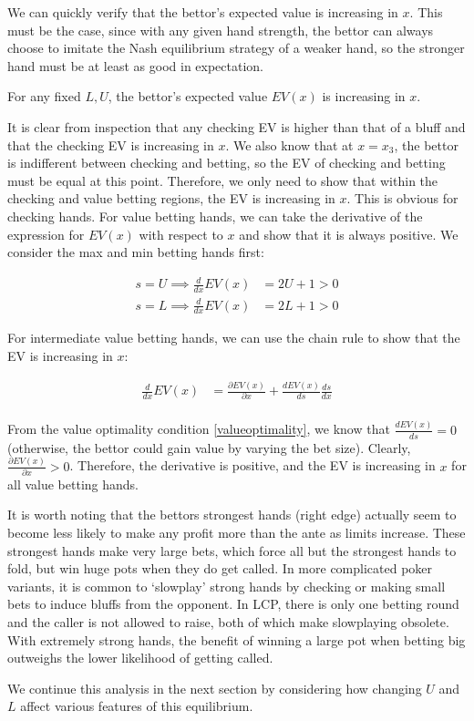 \documentclass[../../main/main.tex]{subfiles}
\begin{document}
We can quickly verify that the bettor's expected value is increasing in $x$. This must be the case, since with any given hand strength, the bettor can always choose to imitate the Nash equilibrium strategy of a weaker hand, so the stronger hand must be at least as good in expectation.

\begin{theorem}
    \label{thm:ev_increasing}
    For any fixed $L, U$, the bettor's expected value $EV(x)$ is increasing in $x$.
\end{theorem}

\begin{customproof}
    It is clear from inspection that any checking EV is higher than that of a bluff and that the checking EV is increasing in $x$. We also know that at $x=x_3$, the bettor is indifferent between checking and betting, so the EV of checking and betting must be equal at this point. Therefore, we only need to show that within the checking and value betting regions, the EV is increasing in $x$. This is obvious for checking hands. For value betting hands, we can take the derivative of the expression for $EV(x)$ with respect to $x$ and show that it is always positive. We consider the max and min betting hands first:
    
    \begin{align*}
        s = U \implies \frac{d}{dx} EV(x) & = 2U + 1 > 0  \\
        s = L \implies \frac{d}{dx} EV(x) & = 2L + 1 > 0 
    \end{align*}
    
    For intermediate value betting hands, we can use the chain rule to show that the EV is increasing in $x$:
    
    \begin{align*}
        \frac{d}{dx} EV(x) & = \frac{\partial EV(x)}{\partial x} + \frac{dEV(x)}{ds} \frac{d s}{d x} \\
    \end{align*}

    From the value optimality condition \ref{valueoptimality}, we know that $\frac{dEV(x)}{ds} = 0$ (otherwise, the bettor could gain value by varying the bet size). Clearly, $\frac{\partial EV(x)}{\partial x} > 0$.  Therefore, the derivative is positive, and the EV is increasing in $x$ for all value betting hands.
\end{customproof}

It is worth noting that the bettors strongest hands (right edge) actually seem to become less likely to make any profit more than the ante as limits increase. These strongest hands make very large bets, which force all but the strongest hands to fold, but win huge pots when they do get called. In more complicated poker variants, it is common to `slowplay' strong hands by checking or making small bets to induce bluffs from the opponent. In LCP, there is only one betting round and the caller is not allowed to raise, both of which make slowplaying obsolete. With extremely strong hands, the benefit of winning a large pot when betting big outweighs the lower likelihood of getting called.

We continue this analysis in the next section by considering how changing $U$ and $L$ affect various features of this equilibrium.
\end{document}
